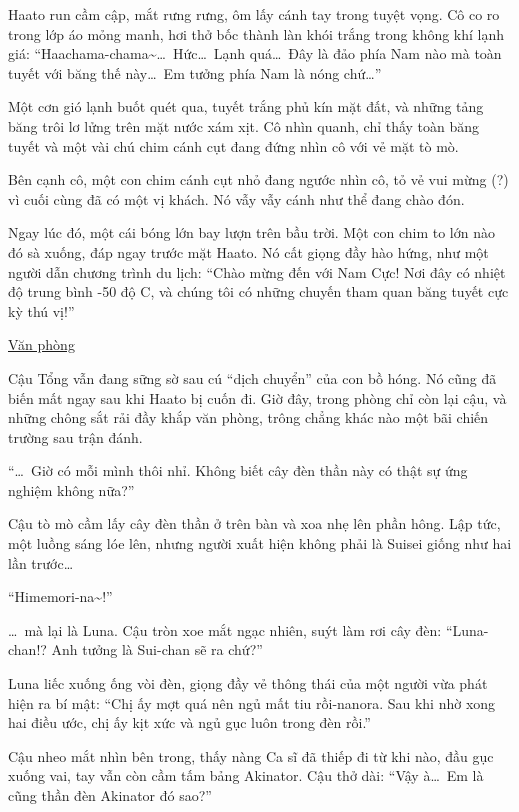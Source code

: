\documentclass[../main.tex]{subfiles}
\begin{document}
Haato run cầm cập, mắt rưng rưng, ôm lấy cánh tay trong tuyệt vọng. Cô co ro trong lớp áo mỏng manh, hơi thở bốc thành làn khói trắng trong không khí lạnh giá: ``Haachama-chama\~{}\dots\ Hức\dots\ Lạnh quá\dots\ Đây là đảo phía Nam nào mà toàn tuyết với băng thế này\dots\ Em tưởng phía Nam là nóng chứ\dots''

Một cơn gió lạnh buốt quét qua, tuyết trắng phủ kín mặt đất, và những tảng băng trôi lơ lửng trên mặt nước xám xịt. Cô nhìn quanh, chỉ thấy toàn băng tuyết và một vài chú chim cánh cụt đang đứng nhìn cô với vẻ mặt tò mò.

Bên cạnh cô, một con chim cánh cụt nhỏ đang ngước nhìn cô, tỏ vẻ vui mừng (?) vì cuối cùng đã có một vị khách. Nó vẫy vẫy cánh như thể đang chào đón.

Ngay lúc đó, một cái bóng lớn bay lượn trên bầu trời. Một con chim to lớn nào đó sà xuống, đáp ngay trước mặt Haato. Nó cất giọng đầy hào hứng, như một người dẫn chương trình du lịch: ``Chào mừng đến với Nam Cực! Nơi đây có nhiệt độ trung bình -50 độ C, và chúng tôi có những chuyến tham quan băng tuyết cực kỳ thú vị!''
\omk

\begin{center}
  \uline{Văn phòng}
\end{center}

Cậu Tổng vẫn đang sững sờ sau cú ``dịch chuyển'' của con bồ hóng. Nó cũng đã biến mất ngay sau khi Haato bị cuốn đi. Giờ đây, trong phòng chỉ còn lại cậu, và những chông sắt rải đầy khắp văn phòng, trông chẳng khác nào một bãi chiến trường sau trận đánh.

``\dots\ Giờ có mỗi mình thôi nhỉ. Không biết cây đèn thần này có thật sự ứng nghiệm không nữa?''

Cậu tò mò cầm lấy cây đèn thần ở trên bàn và xoa nhẹ lên phần hông. Lập tức, một luồng sáng lóe lên, nhưng người xuất hiện không phải là Suisei giống như hai lần trước\dots

``Himemori-na\~{}!''

\dots\ mà lại là Luna. Cậu tròn xoe mắt ngạc nhiên, suýt làm rơi cây đèn: ``Luna-chan!? Anh tưởng là Sui-chan sẽ ra chứ?''

Luna liếc xuống ống vòi đèn, giọng đầy vẻ thông thái của một người vừa phát hiện ra bí mật: ``Chị ấy mợt quá nên ngủ mất tiu rồi-nanora. Sau khi nhờ xong hai điều ước, chị ấy kịt xức và ngủ gục luôn trong đèn rồi.''

Cậu nheo mắt nhìn bên trong, thấy nàng Ca sĩ đã thiếp đi từ khi nào, đầu gục xuống vai, tay vẫn còn cầm tấm bảng Akinator. Cậu thở dài: ``Vậy à\dots\ Em là cũng thần đèn Akinator đó sao?''
\end{document}
